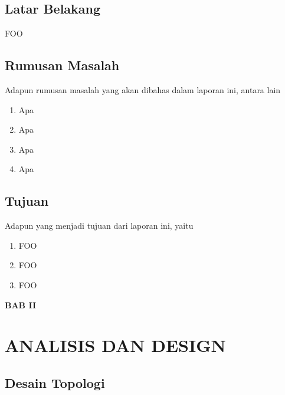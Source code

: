 \documentclass[12pt, a4paper]{article}
\begin{document}
    \subsection{Latar Belakang}

    FOO

    \subsection{Rumusan Masalah}

      Adapun rumusan masalah yang akan dibahas dalam laporan ini, antara lain

      \begin{enumerate}[label=\arabic*.]
        \item Apa 
        \item Apa 
        \item Apa 
        \item Apa
      \end{enumerate}

    \subsection{Tujuan}

      Adapun yang menjadi tujuan dari laporan ini, yaitu

      \begin{enumerate}[label=\arabic*.]
        \item FOO
        \item FOO
        \item FOO
      \end{enumerate}

  \newpage


  \begin{center}
    \large{\textbf{BAB II}}

    \section*{ANALISIS DAN DESIGN}
  \end{center}
  \vspace{1cm}
  \setcounter{section}{2}
  \setcounter{subsection}{0}

  \subsection{Desain Topologi}
\end{document}

